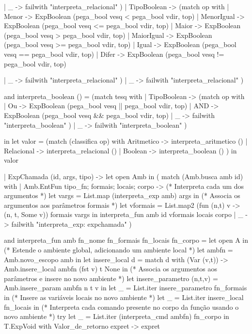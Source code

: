 \documentclass[12pt,a4paper,twoside]{report}
\begin{document}
\begin{terminal}
          | _ -> failwith "interpreta_relacional"
         )
       | TipoBoolean ->
         (match op with
          | Menor -> ExpBoolean (pega_bool vesq < pega_bool vdir, top)
          | MenorIgual -> ExpBoolean (pega_bool vesq <= pega_bool vdir, top)
          | Maior  -> ExpBoolean (pega_bool vesq > pega_bool vdir, top)
          | MaiorIgual  -> ExpBoolean (pega_bool vesq >= pega_bool vdir, top)
          | Igual   -> ExpBoolean (pega_bool vesq == pega_bool vdir, top)
          | Difer   -> ExpBoolean (pega_bool vesq != pega_bool vdir, top)


          | _ -> failwith "interpreta_relacional"
         )
       | _ ->  failwith "interpreta_relacional"
      )

    and interpreta_boolean () =
      (match tesq with
       | TipoBoolean ->
         (match op with
          | Ou -> ExpBoolean (pega_bool vesq || pega_bool vdir, top)
          | AND ->   ExpBoolean (pega_bool vesq && pega_bool vdir, top)
          | _ ->  failwith "interpreta_boolean"
         )
       | _ ->  failwith "interpreta_boolean"
      )
    
    in
    let valor = (match (classifica op) with
          Aritmetico -> interpreta_aritmetico ()
        | Relacional -> interpreta_relacional ()
        | Boolean -> interpreta_boolean ()
      )
    in
      valor

  | ExpChamada (id, args, tipo) ->
    let open Amb in
    ( match (Amb.busca amb id) with
      | Amb.EntFun {tipo_fn; formais; locais; corpo} ->
           (* Interpreta cada um dos argumentos *)
           let vargs = List.map (interpreta_exp amb) args in
           (* Associa os argumentos aos parâmetros formais *)
           let vformais = List.map2 (fun (n,t) v -> (n, t, Some v)) formais vargs
           in interpreta_fun amb id vformais locais corpo
      | _ -> failwith "interpreta_exp: expchamada"
    )

and interpreta_fun amb fn_nome fn_formais fn_locais fn_corpo =
  let open A in
 (* Estende o ambiente global, adicionando um ambiente local *)
  let ambfn = Amb.novo_escopo amb in
   let insere_local  d =
    match d with
      (Var (v,t)) -> Amb.insere_local ambfn (fst v)  t None
  in
  (* Associa os argumentos aos parâmetros e insere no novo ambiente *)
  let insere_parametro (n,t,v) = Amb.insere_param ambfn n t v in
  let _ = List.iter insere_parametro fn_formais in
  (* Insere as variáveis locais no novo ambiente *)
    let _ = List.iter insere_local fn_locais in
    (* Interpreta cada comando presente no corpo da função usando o novo
       ambiente *)
  try
    let _ = List.iter (interpreta_cmd ambfn) fn_corpo in T.ExpVoid
    with
       Valor_de_retorno expret -> expret


\end{terminal}
\end{document}
